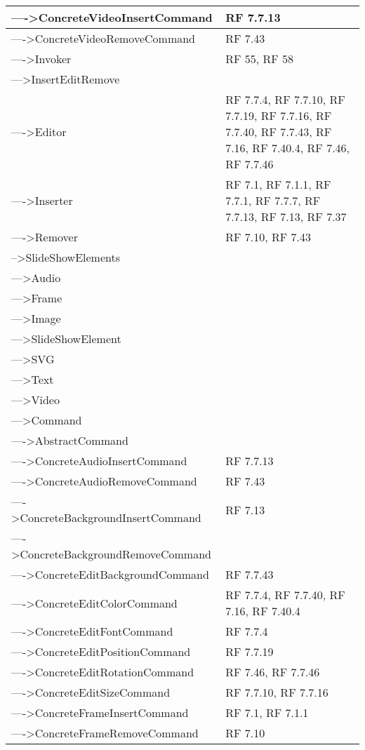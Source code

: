 {\begin{longtable} [c]{| p{8cm} | p{5cm} |}
 \hline 
---->ConcreteVideoInsertCommand & RF 7.7.13\\ 
 \hline 
---->ConcreteVideoRemoveCommand & RF 7.43\\ 
 \hline 
---->Invoker & RF 55, RF 58\\ 
 \hline 
--->InsertEditRemove & \\ 
 \hline 
---->Editor & RF 7.7.4, RF 7.7.10, RF 7.7.19, RF 7.7.16, RF 7.7.40, RF 7.7.43, RF 7.16, RF 7.40.4, RF 7.46, RF 7.7.46\\ 
 \hline 
---->Inserter & RF 7.1, RF 7.1.1, RF 7.7.1, RF 7.7.7, RF 7.7.13, RF 7.13, RF 7.37\\ 
 \hline 
---->Remover & RF 7.10, RF 7.43\\ 
 \hline 
-->SlideShowElements & \\ 
 \hline 
--->Audio & \\ 
 \hline 
--->Frame & \\ 
 \hline 
--->Image & \\ 
 \hline 
--->SlideShowElement & \\ 
 \hline 
--->SVG & \\ 
 \hline 
--->Text & \\ 
 \hline 
--->Video & \\ 
 \hline 
--->Command & \\ 
 \hline 
---->AbstractCommand & \\ 
 \hline 
---->ConcreteAudioInsertCommand & RF 7.7.13\\ 
 \hline 
---->ConcreteAudioRemoveCommand & RF 7.43\\ 
 \hline 
---->ConcreteBackgroundInsertCommand & RF 7.13\\ 
 \hline 
---->ConcreteBackgroundRemoveCommand & \\ 
 \hline 
---->ConcreteEditBackgroundCommand & RF 7.7.43\\ 
 \hline 
---->ConcreteEditColorCommand & RF 7.7.4, RF 7.7.40, RF 7.16, RF 7.40.4\\ 
 \hline 
---->ConcreteEditFontCommand & RF 7.7.4\\ 
 \hline 
---->ConcreteEditPositionCommand & RF 7.7.19\\ 
 \hline 
---->ConcreteEditRotationCommand & RF 7.46, RF 7.7.46\\ 
 \hline 
---->ConcreteEditSizeCommand & RF 7.7.10, RF 7.7.16\\ 
 \hline 
---->ConcreteFrameInsertCommand & RF 7.1, RF 7.1.1\\ 
 \hline 
---->ConcreteFrameRemoveCommand & RF 7.10\\ 

\end{longtable}}
